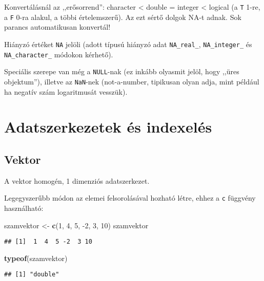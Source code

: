 \documentclass[]{book}
\newenvironment{Shaded}{\begin{snugshade}}{\end{snugshade}}
\newcommand{\DecValTok}[1]{\textcolor[rgb]{0.00,0.00,0.81}{#1}}
\newcommand{\KeywordTok}[1]{\textcolor[rgb]{0.13,0.29,0.53}{\textbf{#1}}}
\newcommand{\NormalTok}[1]{#1}
\newcommand{\StringTok}[1]{\textcolor[rgb]{0.31,0.60,0.02}{#1}}
\begin{document}
Konvertálásnál az ,,erősorrend'': character \textless{} double = integer \textless{} logical (a \texttt{T} 1-re, a \texttt{F} 0-ra alakul, a többi értelemszerű). Az ezt sértő dolgok NA-t adnak. Sok parancs automatikusan konvertál!

Hiányzó értéket \texttt{NA} jelöli (adott típusú hiányzó adat \texttt{NA\_real\_}, \texttt{NA\_integer\_} és \texttt{NA\_character\_} módokon kérhető).

Speciális szerepe van még a \texttt{NULL}-nak (ez inkább olyasmit jelöl, hogy ,,üres objektum''), illetve az \texttt{NaN}-nek (not-a-number, tipikusan olyan adja, mint például ha negatív szám logaritmusát vesszük).

\hypertarget{adatszerkezetek-uxe9s-indexeluxe9s}{%
\section{Adatszerkezetek és indexelés}\label{adatszerkezetek-uxe9s-indexeluxe9s}}

\hypertarget{vektor}{%
\subsection{Vektor}\label{vektor}}

A vektor homogén, 1 dimenziós adatszerkezet.

Legegyszerűbb módon az elemei felsorolásával hozható létre, ehhez a \texttt{c} függvény használható:

\begin{Shaded}
\begin{Highlighting}[]
\NormalTok{szamvektor <-}\StringTok{ }\KeywordTok{c}\NormalTok{(}\DecValTok{1}\NormalTok{, }\DecValTok{4}\NormalTok{, }\DecValTok{5}\NormalTok{, }\DecValTok{-2}\NormalTok{, }\DecValTok{3}\NormalTok{, }\DecValTok{10}\NormalTok{)}
\NormalTok{szamvektor}
\end{Highlighting}
\end{Shaded}

\begin{verbatim}
## [1]  1  4  5 -2  3 10
\end{verbatim}

\begin{Shaded}
\begin{Highlighting}[]
\KeywordTok{typeof}\NormalTok{(szamvektor)}
\end{Highlighting}
\end{Shaded}

\begin{verbatim}
## [1] "double"
\end{verbatim}
\end{document}
